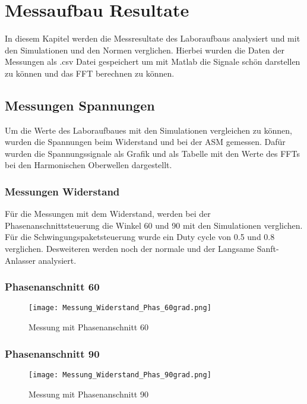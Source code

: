 \section{Messaufbau Resultate}
In diesem Kapitel werden die Messresultate des Laboraufbaus analysiert und mit den Simulationen und den Normen verglichen. Hierbei wurden die Daten der Messungen als .csv Datei gespeichert um mit Matlab die Signale schön darstellen zu können und das FFT berechnen zu können. 

\subsection{Messungen Spannungen}
Um die Werte des Laboraufbaues mit den Simulationen vergleichen zu können, wurden die Spannungen beim Widerstand und bei der ASM gemessen. Dafür wurden die Spannungssignale als Grafik und als Tabelle mit den Werte des FFTs bei den Harmonischen Oberwellen dargestellt.

\subsubsection{Messungen Widerstand}
Für die Messungen mit dem Widerstand, werden bei der Phasenanschnittsteuerung die Winkel 60\textdegree \hspace{0.02cm} und 90\textdegree \hspace{0.02cm} mit den Simulationen verglichen. Für die Schwingungspaketsteuerung wurde ein Duty cycle von 0.5 und 0.8 verglichen. Desweiteren werden noch der normale und der Langsame Sanft-Anlasser analysiert.


\subsubsection*{Phasenanschnitt 60\textdegree}

\begin{figure}[ht!]
	\centering
	\texttt{[image: Messung\_Widerstand\_Phas\_60grad.png]}	
	\caption{Messung mit Phasenanschnitt 60\textdegree}\label{fig:Mess_Phas_60}
\end{figure}
\newpage
\subsubsection*{Phasenanschnitt 90\textdegree}
\begin{figure}[ht!]
	\centering
	\texttt{[image: Messung\_Widerstand\_Phas\_90grad.png]}	
	\caption{Messung mit Phasenanschnitt 90\textdegree}\label{fig:Mess_Phas_90}
\end{figure}

